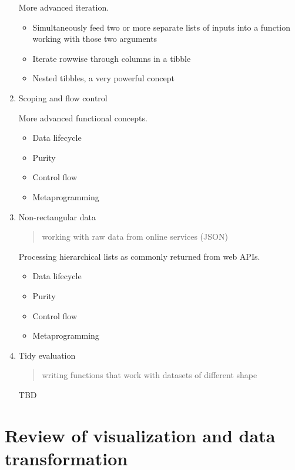 \documentclass[]{book}
\providecommand{\tightlist}{%
  \setlength{\itemsep}{0pt}\setlength{\parskip}{0pt}}
\begin{document}
\begin{enumerate}
  More advanced iteration.

  \begin{itemize}
  \tightlist
  \item
    Simultaneously feed two or more separate lists of inputs into a function working with those two arguments
  \item
    Iterate rowwise through columns in a tibble
  \item
    Nested tibbles, a very powerful concept
  \end{itemize}
\item
  Scoping and flow control

  More advanced functional concepts.

  \begin{itemize}
  \tightlist
  \item
    Data lifecycle
  \item
    Purity
  \item
    Control flow
  \item
    Metaprogramming
  \end{itemize}
\item
  Non-rectangular data

  \begin{quote}
  working with raw data from online services (JSON)
  \end{quote}

  Processing hierarchical lists as commonly returned from web APIs.

  \begin{itemize}
  \tightlist
  \item
    Data lifecycle
  \item
    Purity
  \item
    Control flow
  \item
    Metaprogramming
  \end{itemize}
\item
  Tidy evaluation

  \begin{quote}
  writing functions that work with datasets of different shape
  \end{quote}

  TBD
\end{enumerate}

\hypertarget{review-of-visualization-and-data-transformation}{%
\section{Review of visualization and data transformation}\label{review-of-visualization-and-data-transformation}}
\end{document}

